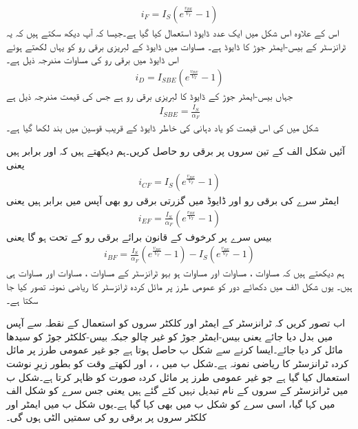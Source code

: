 \begin{align}
i_F = I_S \left (e^{\frac{v_{BE}}{V_T}}-1 \right )
\end{align}
اس کے علاوہ اس شکل میں ایک عدد ڈایوڈ استعمال کیا گیا ہے۔جیسا کہ آپ دیکھ سکتے ہیں کہ یہ ٹرانزسٹر کے بیس-ایمٹر  جوڑ کا ڈایوڈ   ہے۔ مساوات  میں ڈایوڈ کے لبریزی برقی رو کو یہاں لکھتے ہوئے اس ڈایوڈ میں برقی رو کی مساوات مندرجہ ذیل ہے۔
\begin{align}
i_D=I_{SBE} \left (e^{\frac{v_{BE}}{V_T}}-1 \right )
\end{align}
جہاں   بیس-ایمٹر  جوڑ کے ڈایوڈ کا لبریزی برقی رو ہے جس کی قیمت مندرجہ ذیل ہے
\begin{align}
I_{SBE}=\frac{I_S}{\alpha_F}
\end{align}
شکل میں  کی اس قیمت کو یاد دہانی کی خاطر ڈایوڈ کے قریب قوسین میں بند لکھا گیا ہے۔

آئیں شکل  الف کے تین سروں پر برقی رو حاصل کریں۔ہم دیکھتے ہیں کہ  اور  برابر ہیں یعنی
\begin{align} \label{مساوات_ٹرانزسٹر_ہوبہو_کلکٹر _سیدھی_رو}
i_{CF}=I_S \left (e^{\frac{v_{BE}}{V_T}}-1 \right )
\end{align}
ایمٹر سرے کی برقی رو  اور ڈایوڈ    میں گزرتی برقی رو   بھی آپس میں برابر ہیں یعنی
\begin{align} \label{مساوات_ٹرانزسٹر_ہوبہو_مخارج_سیدھی_رو}
i_{EF}=\frac{I_S}{\alpha_F} \left (e^{\frac{v_{BE}}{V_T}}-1 \right )
\end{align}
بیس سرے پر کرخوف کے قانون برائے برقی رو کے تحت   ہو گا یعنی
\begin{align} \label{مساوات_ٹرانزسٹر_ہوبہو_قابو_سیدھی_رو_الف}
i_{BF}=\frac{I_S}{\alpha_F} \left (e^{\frac{v_{BE}}{V_T}}-1 \right )-I_S \left (e^{\frac{v_{BE}}{V_T}}-1 \right )
\end{align}
ہم دیکھتے ہیں کہ مساوات  ، مساوات   اور مساوات   ہو بہو ٹرانزسٹر کے مساوات  ، مساوات   اور مساوات   ہی ہیں۔ یوں شکل  الف میں دکھائے دور کو عمومی طرز پر مائل کردہ ٹرانزسٹر کا ریاضی نمونہ  تصور کیا جا سکتا ہے۔

اب تصور کریں کہ ٹرانزسٹر کے ایمٹر اور کلکٹر  سروں کو استعمال کے نقطہ سے آپس میں بدل دیا جائے یعنی بیس-ایمٹر  جوڑ کو غیر چالو جبکہ بیس-کلکٹر جوڑ کو سیدھا مائل کر دیا جائے۔ایسا کرنے سے شکل  ب حاصل ہوتا ہے جو غیر عمومی طرز پر مائل کردہ ٹرانزسٹر کا ریاضی نمونہ  ہے۔شکل  ب میں   ، ، اور  لکھتے وقت   کو بطور  زیرِ نوشت استعمال کیا گیا ہے جو غیر عمومی طرز پر مائل کردہ صورت کو ظاہر کرتا ہے۔شکل  ب میں ٹرانزسٹر کے سروں کے نام تبدیل نہیں کئے گئے ہیں یعنی جس سرے کو شکل  الف   میں  کہا گیا، اسی سرے کو شکل  ب میں بھی  کہا گیا ہے۔یوں شکل  ب میں ایمٹر اور کلکٹر  سروں پر برقی رو کی سمتیں الٹی ہوں گی۔

